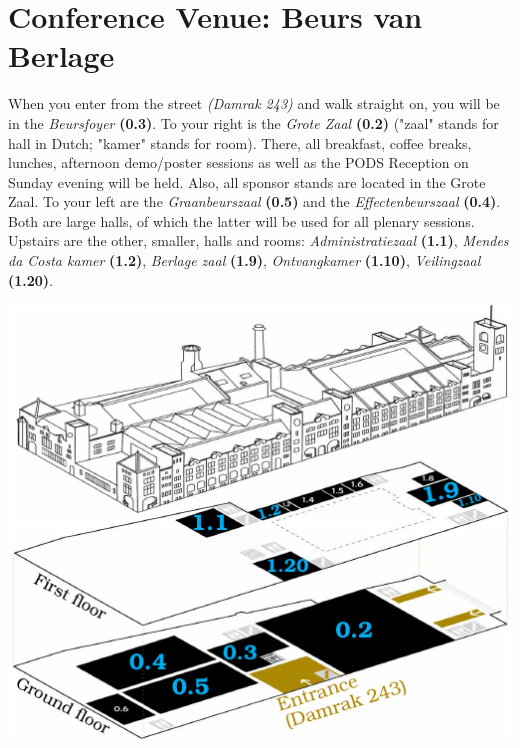 
\clearpage
\ifodd\value{page}\hbox{}\newpage\fi
\section*{Conference Venue: Beurs van Berlage}

When you enter from the street \emph{(Damrak 243)} and walk straight on, you will be in the \emph{Beursfoyer} \textbf{(0.3)}. To your right is the \emph{Grote Zaal} \textbf{(0.2)} ("zaal" stands for hall in Dutch; "kamer" stands for room). There, all breakfast, coffee breaks, lunches, afternoon demo/poster sessions as well as the PODS Reception on Sunday evening will be held. Also, all sponsor stands are located in the Grote Zaal. To your left are the \emph{Graanbeurszaal} \textbf{(0.5)} and the \emph{Effectenbeurszaal} \textbf{(0.4)}. Both are large halls, of which the latter will be used for all plenary sessions. Upstairs are the other, smaller, halls and rooms: \emph{Administratiezaal} \textbf{(1.1)}, \emph{Mendes da Costa kamer} \textbf{(1.2)}, \emph{Berlage zaal} \textbf{(1.9)}, \emph{Ontvangkamer} \textbf{(1.10)}, \emph{Veilingzaal} \textbf{(1.20)}.

\includegraphics[width=\textwidth]{images/BvB-plan-3D-85mm-x-1__mm.pdf}%


